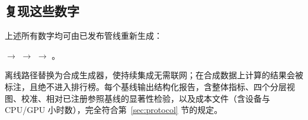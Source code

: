 \subsection{复现这些数字}
\label{sec:results-repro}

上述所有数字均可由已发布管线重新生成：
\begin{center}\small
{} $\to$
 $\to$
 $\to$
。
\end{center}
离线路径替换为合成生成器，使持续集成无需联网；在合成数据上计算的结果会被标注，且绝不进入排行榜。每个基线输出结构化报告，含整体指标、四个分层视图、校准、相对已注册参照基线的显著性检验，以及成本文件（含设备与 CPU/GPU 小时数），完全符合第~\ref{sec:protocol} 节的规定。
